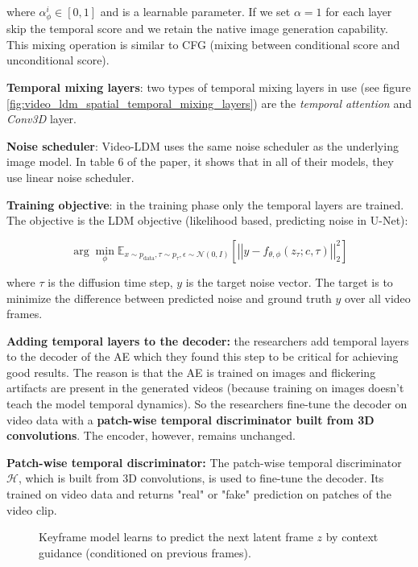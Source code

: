 where $\alpha_\phi^i \in [0, 1]$ and is a learnable parameter. If we set $\alpha = 1$ for each layer skip the temporal score and we retain the native image generation capability. This mixing operation is similar to CFG (mixing between conditional score and unconditional score).

\textbf{Temporal mixing layers}: two types of temporal mixing layers in use (see figure \ref{fig:video_ldm_spatial_temporal_mixing_layers}) are the \textit{temporal attention} and \textit{Conv3D} layer.

\textbf{Noise scheduler}: Video-LDM uses the same noise scheduler as the underlying image model. In table 6 of the paper, it shows that in all of their models, they use linear noise scheduler.

\textbf{Training objective}: in the training phase only the temporal layers are trained. The objective is the LDM objective (likelihood based, predicting noise in U-Net):

\[ \arg \min_\phi \mathbb{E}_{x \sim p_{\text{data}}, \tau \sim p_{\tau}, \epsilon \sim \mathcal{N} (0, I)} \left[ \left| \left| y - f_{\theta,\phi} (z_{\tau} ; c, \tau) \right| \right|^2_2 \right] \]

where $\tau$ is the diffusion time step, $y$ is the target noise vector. The target is to minimize the difference between predicted noise and ground truth $y$ over all video frames.

\textbf{Adding temporal layers to the decoder:} the researchers add temporal layers to the decoder of the AE which they found this step to be critical for achieving good results. The reason is that the AE is trained on images and flickering artifacts are present in the generated videos (because training on images doesn't teach the model temporal dynamics). So the researchers fine-tune the decoder on video data with a \textbf{patch-wise temporal discriminator built from 3D convolutions}. The encoder, however, remains unchanged.

\textbf{Patch-wise temporal discriminator:} The patch-wise temporal discriminator $\mathcal{H}$, which is built from 3D convolutions, is used to fine-tune the decoder. Its trained on video data and returns "real" or "fake" prediction on patches of the video clip.


\begin{figure}
    \centering
    \scalebox{0.4}{
        
    }
    \caption{Keyframe model learns to predict the next latent frame $z$ by context guidance (conditioned on previous frames).}
\end{figure}


